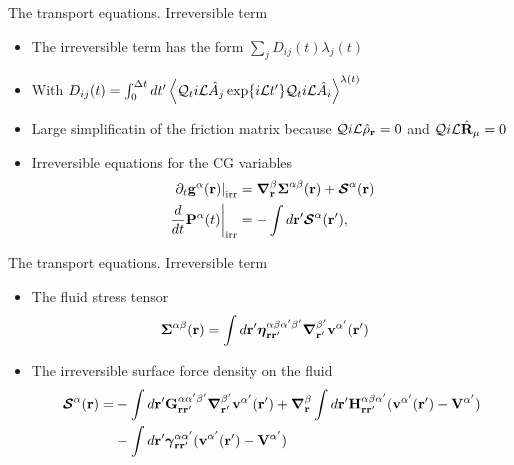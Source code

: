 \documentclass{beamer}
\begin{document}
\begin{frame}{The transport equations. Irreversible term}
  \begin{itemize}
    \item The irreversible term has the form 
        $\sum_{j}D_{ij}(t)\lambda_{j}(t)$
    \item With
$D_{ij}(t)=\int_0^{\Delta t} dt'\left\langle 
{\cal Q}_t i{\cal L}\hat{A}_j\exp\{i{\cal L}t'\}{\cal Q}_t i{\cal L}\hat{A}_i
\right\rangle^{\lambda(t)}$
\item Large simplificatin of the friction matrix because 
${\cal Q} i{\cal L}\hat{\rho}_{\bf r}=0$
and ${\cal Q}  i{\cal L}\hat{{\bf R}}_{\mu}=0$
\item Irreversible equations for the CG variables
\begin{align}
\left.  \partial_t{\bf g}^\alpha({\bf r})\right|_{\rm irr}&= \boldsymbol{\nabla}_{\bf r}^{\beta}\boldsymbol{\Sigma}^{\alpha\beta}({\bf r}) +\boldsymbol{{\cal S}}^\alpha({\bf r}) 
\nonumber\\
\left.\frac{d}{dt}{\bf P}^\alpha(t)\right|_{\rm irr}&=-\int d{\bf r}'   \boldsymbol{{\cal S}}^\alpha({\bf r}'),
\nonumber
\end{align}
\end{itemize}
\end{frame}

\begin{frame}{The transport equations. Irreversible term}
  \begin{itemize}
    \item The fluid \alert{stress tensor}
  \begin{align}
  \boldsymbol{\Sigma}^{\alpha\beta}({\bf r})&=
\int d{\bf r}'
\boldsymbol{\eta}^{\alpha\beta\alpha'\beta'}_{{\bf r}{\bf r}'}
\boldsymbol{\nabla}_{{\bf r}'}^{\beta'}{\bf v}^{\alpha'}({\bf r}')
\nonumber
\end{align}
\item The \alert{irreversible surface force density} on the fluid
\begin{align}
  \boldsymbol{{\cal S}}^\alpha({\bf r})=&
-\int d{\bf r}'{\bf G}^{\alpha\alpha'\beta'}_{{\bf r}{\bf r}'}
\boldsymbol{\nabla}_{{\bf r}'}^{\beta'} {\bf v}^{\alpha'}({\bf r}')
+\boldsymbol{\nabla}_{{\bf r}}^{\beta}\int d{\bf r}'{\bf H}^{\alpha\beta\alpha'}_{{\bf r}{\bf r}'}
( {\bf v}^{\alpha'}({\bf r}')-{\bf V}^{\alpha'})
\nonumber\\
&-\int d{\bf r}'
\boldsymbol{\gamma}^{\alpha\alpha'}_{{\bf r}{\bf r}'}( {\bf v}^{\alpha'}({\bf r}')
-{\bf V}^{\alpha'})
\nonumber
\end{align}
\end{itemize}
\end{frame}
\end{document}
